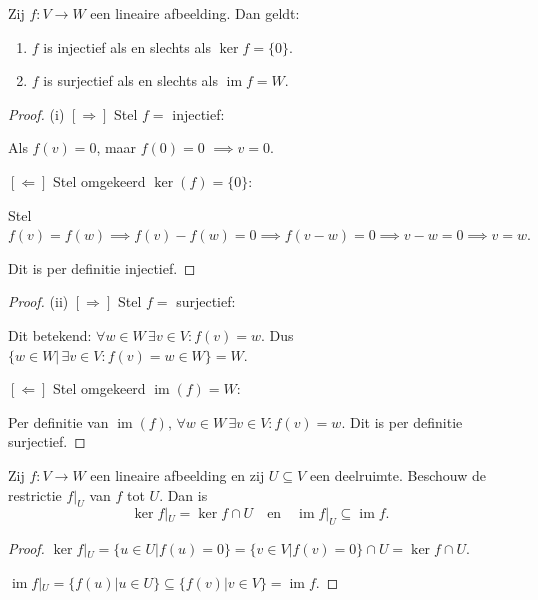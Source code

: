 \begin{lemma}[3.2.4]
    Zij $f \colon V \to W$ een lineaire afbeelding. Dan geldt:
    \begin{enumerate}
        \item[(i)] $f$ is injectief als en slechts als $\ker f = \{0\}$.
        \item[(ii)] $f$ is surjectief als en slechts als $\operatorname{im} f = W$.
    \end{enumerate}
\end{lemma}
\begin{proof}(i)
    \([\Rightarrow]\) Stel \(f = \) injectief:

    Als \(f(v) = 0\), maar \(f(0) = 0\)
    \(\implies v = 0\).

    \([\Leftarrow]\) Stel omgekeerd \(\ker (f) = \{0\}\):

    Stel 
    \(
        f(v) = f(w)
         \implies f(v) - f(w) = 0 
            \implies f(v-w) = 0
         \implies v-w = 0
         \implies v = w.
    \)

    Dit is per definitie injectief.
\end{proof}
\begin{proof}(ii)
    \([\Rightarrow]\) Stel \(f = \) surjectief:

    Dit betekend: \(\forall w \in W \, \exists v \in V: f(v) = w\).
    Dus \(\{w \in W |\, \exists v \in V: f(v) = w \in W \} = W\).

    \([\Leftarrow]\) Stel omgekeerd \(\operatorname{im} (f) = W\):

    Per definitie van \(\operatorname{im}(f),\, \forall w \in W \,\exists v \in V: f(v) = w \).
    Dit is per definitie surjectief.
\end{proof}

\begin{lemma}[3.2.5]
    Zij $f \colon V \to W$ een lineaire afbeelding en zij $U \subseteq V$ een deelruimte. Beschouw de restrictie $f|_U$ van $f$ tot $U$. Dan is
    \[ \ker f|_U = \ker f \cap U \quad \text{en} \quad \operatorname{im} f|_U \subseteq \operatorname{im} f. \]
\end{lemma}
\begin{proof}
    \(\ker f|_U  = \{u \in U |f(u)=0\} = \{v \in V |f(v)=0\} \cap U= \ker f \cap U\).


    \(\operatorname{im}f|_U = \{f(u)|u\in U\} \subseteq \{f(v)|v\in V\} = \operatorname{im} f \).
\end{proof}


